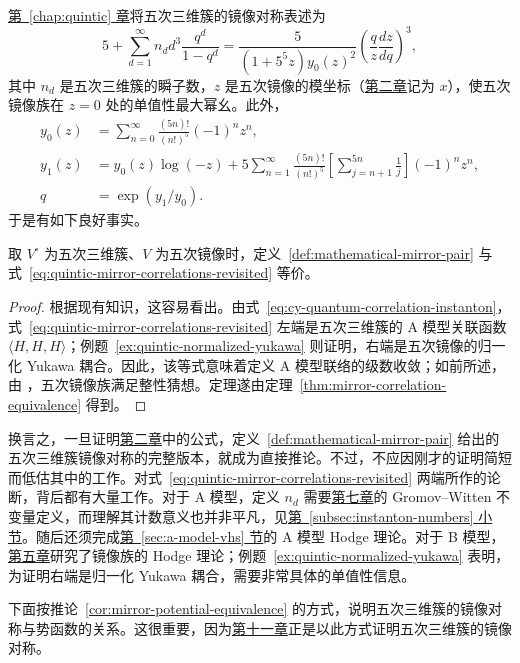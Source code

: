 \hyperref[chap:quintic]{第~\ref*{chap:quintic} 章}将五次三维簇的镜像对称表述为
\begin{equation}\label{eq:quintic-mirror-correlations-revisited}
5+\sum_{d=1}^\infty n_dd^3\frac{q^d}{1-q^d}
=\frac5{(1+5^5z)y_0(z)^2}\left(\frac qz\frac{dz}{dq}\right)^3,
\end{equation}
其中 $n_d$ 是五次三维簇的瞬子数，$z$ 是五次镜像的模坐标（\hyperref[chap:quintic]{第二章}记为 $x$），使五次镜像族在 $z=0$ 处的单值性最大幂幺。此外，
\[
\begin{aligned}
y_0(z)&=\sum_{n=0}^\infty\frac{(5n)!}{(n!)^5}(-1)^nz^n,\\
y_1(z)&=y_0(z)\log(-z)+5\sum_{n=1}^\infty\frac{(5n)!}{(n!)^5}
\left[\sum_{j=n+1}^{5n}\frac1j\right](-1)^nz^n,\\
q&=\exp(y_1/y_0).
\end{aligned}
\]
于是有如下良好事实。
\begin{theorem}\label{thm:quintic-mirror-correlation-equivalence}
取 $V^\circ$ 为五次三维簇、$V$ 为五次镜像时，定义~\ref{def:mathematical-mirror-pair} 与式~\eqref{eq:quintic-mirror-correlations-revisited} 等价。
\end{theorem}
\begin{proof}
根据现有知识，这容易看出。由式~\eqref{eq:cy-quantum-correlation-instanton}，式~\eqref{eq:quintic-mirror-correlations-revisited} 左端是五次三维簇的 A 模型关联函数 $\langle H,H,H\rangle$；例题~\ref{ex:quintic-normalized-yukawa} 则证明，右端是五次镜像的归一化 Yukawa 耦合。因此，该等式意味着定义 A 模型联络的级数收敛；如前所述，由 ，五次镜像族满足整性猜想。定理遂由定理~\ref{thm:mirror-correlation-equivalence} 得到。
\end{proof}
换言之，一旦证明\hyperref[chap:quintic]{第二章}中的公式，定义~\ref{def:mathematical-mirror-pair} 给出的五次三维簇镜像对称的完整版本，就成为直接推论。不过，不应因刚才的证明简短而低估其中的工作。对式~\eqref{eq:quintic-mirror-correlations-revisited} 两端所作的论断，背后都有大量工作。对于 A 模型，定义 $n_d$ 需要\hyperref[chap:gromov-witten]{第七章}的 Gromov--Witten 不变量定义，而理解其计数意义也并非平凡，见\hyperref[subsec:instanton-numbers]{第~\ref*{subsec:instanton-numbers} 小节}。随后还须完成\hyperref[sec:a-model-vhs]{第~\ref*{sec:a-model-vhs} 节}的 A 模型 Hodge 理论。对于 B 模型，\hyperref[chap:hodge-yukawa]{第五章}研究了镜像族的 Hodge 理论；例题~\ref{ex:quintic-normalized-yukawa} 表明，为证明右端是归一化 Yukawa 耦合，需要非常具体的单值性信息。

下面按推论~\ref{cor:mirror-potential-equivalence} 的方式，说明五次三维簇的镜像对称与势函数的关系。这很重要，因为\hyperref[chap:mirror-theorem]{第十一章}正是以此方式证明五次三维簇的镜像对称。

